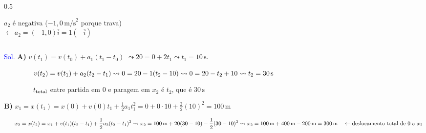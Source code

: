 \documentclass{beamer}
\begin{document}
\begin{frame}{}
\begin{columns}[T]
\begin{column}{0.5\textwidth}
\begin{center}
			\end{center}
			\vspace{-0.2cm}
			\begin{flushright}
				\tiny $a_2$ é negativa ($-1,0\,\text{m/s}^2$ porque trava) \\
				$\leftarrow \overline{a}_2 = (-1,0)\overline{i} = 1(-\overline{i})$
			\end{flushright}
		\end{column}
	\end{columns}
	
	\textcolor{blue}{Sol.} \textbf{A)} \quad $v(t_1) = v(t_0) + a_1(t_1 - t_0)$
	$\leadsto 20 = 0 + 2 t_1  \leadsto  t_1 = 10\,\text{s}$.
	
	\vspace{0.1cm}
	$\hspace{1.5cm} v(t_2) = v(t_1) + a_2(t_2 - t_1)  \leadsto  0 = 20 - 1(t_2 - 10)  \leadsto  0 = 20 - t_2 + 10  \leadsto  t_2 = 30\,\text{s}$
	
	\vspace{0.1cm}
	$\hspace{1.5cm} t_{\text{total}}$ entre partida em 0 e paragem em $x_2$ é $t_2$, que é $30\,\text{s}$
	
	\vspace{0.1cm}
	\textbf{B)} \quad $\displaystyle x_1 = x(t_1) = x(0) + v(0)t_1 + \frac{1}{2}a_1 t_1^2 = 0 + 0 \cdot 10 + \frac{2}{2}(10)^2 = 100\,\text{m}$
	
	\vspace{0.1cm}
	$\displaystyle \hspace{0.6cm} x_2 = x(t_2) = x_1 + v(t_1)(t_2 - t_1) + \frac{1}{2}a_2(t_2 - t_1)^2  \leadsto x_2 = 100\,\text{m} + 20(30 - 10) - \frac{1}{2}(30 - 10)^2 \leadsto x_2 = 100\,\text{m} + 400\,\text{m} - 200\,\text{m} = 300\,\text{m} \quad \leftarrow \text{deslocamento total de 0 a } x_2$
	
\end{frame}
\end{document}
